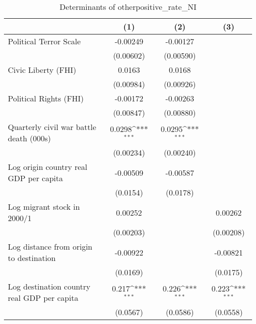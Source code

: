 \begin{table}[htbp]\centering
\def\sym#1{\ifmmode^{#1}\else\(^{#1}\)\fi}
\caption{Determinants of otherpositive\_rate\_NI}
\begin{tabular}{l*{3}{c}}
\hline\hline
                    &\multicolumn{1}{c}{(1)}         &\multicolumn{1}{c}{(2)}         &\multicolumn{1}{c}{(3)}         \\
\hline
Political Terror Scale&    -0.00249         &    -0.00127         &                     \\
                    &   (0.00602)         &   (0.00590)         &                     \\
[1em]
Civic Liberty (FHI) &      0.0163         &      0.0168         &                     \\
                    &   (0.00984)         &   (0.00926)         &                     \\
[1em]
Political Rights (FHI)&    -0.00172         &    -0.00263         &                     \\
                    &   (0.00847)         &   (0.00880)         &                     \\
[1em]
Quarterly civil war battle death (000s)&      0.0298\sym{***}&      0.0295\sym{***}&                     \\
                    &   (0.00234)         &   (0.00240)         &                     \\
[1em]
Log origin country real GDP per capita&    -0.00509         &    -0.00587         &                     \\
                    &    (0.0154)         &    (0.0178)         &                     \\
[1em]
Log migrant stock in 2000/1&     0.00252         &                     &     0.00262         \\
                    &   (0.00203)         &                     &   (0.00208)         \\
[1em]
Log distance from origin to destination&    -0.00922         &                     &    -0.00821         \\
                    &    (0.0169)         &                     &    (0.0175)         \\
[1em]
Log destination country real GDP per capita&       0.217\sym{***}&       0.226\sym{***}&       0.223\sym{***}\\
                    &    (0.0567)         &    (0.0586)         &    (0.0558)         \\

\end{tabular}
\end{table}
